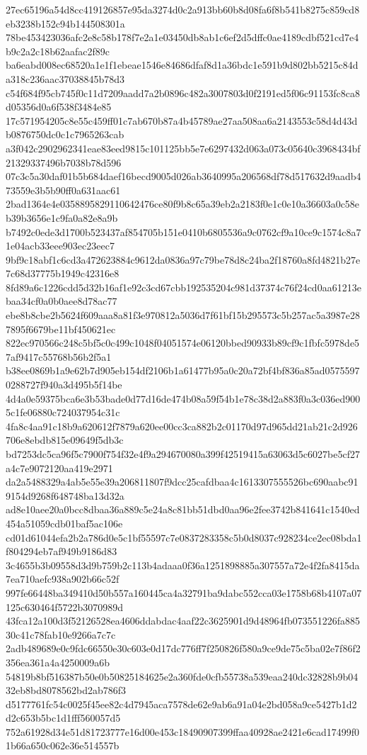 {27ec65196a54d8cc419126857e95da3274d0c2a913bb60b8d08fa6f8b541b8275c859cd8eb3238b152c94b144508301a
78be453423036afc2e8c58b178f7e2a1e03450db8ab1c6ef2d5dffc0ae4189cdbf521cd7e4b9c2a2c18b62aafac2f89c
ba6eabd008ec68520a1e1f1ebeae1546e84686dfaf8d1a36bdc1e591b9d802bb5215c84da318c236aac37038845b78d3
c54f684f95cb745f0c11d7209aadd7a2b0896c482a3007803d0f2191ed5f06c91153fc8ca8d05356d0a6f538f3484e85
17c571954205c8e55c459ff01c7ab670b87a4b45789ae27aa508aa6a2143553c58d4d43db0876750dc0c1c7965263cab
a3f042c2902962341eae83eed9815c101125bb5e7e6297432d063a073c05640c3968434bf21329337496b7038b78d596
07c3c5a30daf01b5b684daef16becd9005d026ab3640995a206568df78d517632d9aadb473559e3b5b90ff0a631aac61
2bad1364e4e0358895829110642476ce80f9b8c65a39eb2a2183f0e1c0e10a36603a0c58eb39b3656e1c9fa0a82e8a9b
b7492c0ede3d1700b523437af854705b151e0410b6805536a9c0762cf9a10ce9c1574c8a71e04acb33eee903ec23eec7
9bf9c18abf1c6cd3a472623884c9612da0836a97c79be78d8c24ba2f18760a8fd4821b27e7c68d37775b1949c42316e8
8fd89a6c1226cdd5d32b16af1e92c3cd67cbb192535204c981d37374c76f24cd0aa61213ebaa34cf0a0b0aee8d78ac77
ebe8b8cbe2b5624f609aaa8a81f3e970812a5036d7f61bf15b295573c5b257ac5a3987e287895f6679be11bf450621ec
822ec970566c248c5bf5c0c499c1048f04051574e06120bbed90933b89cf9c1fbfc5978de57af9417c55768b56b2f5a1
b38ee0869b1a9e62b7d905eb154df2106b1a61477b95a0c20a72bf4bf836a85ad05755970288727f940a3d495b5f14be
4d4a0e59375bca6e3b53bade0d77d16de474b08a59f54b1e78c38d2a883f0a3c036ed9005c1fe06880c724037954c31c
4fa8c4aa91c18b9a620612f7879a620ee00cc3ca882b2c01170d97d965dd21ab21c2d926706e8ebdb815e09649f5db3c
bd7253dc5ca96f5c7900f754f32e4f9a294670080a399f42519415a63063d5c6027be5cf27a4c7e9072120aa419e2971
da2a5488329a4ab5e55e39a206811807f9dcc25cafdbaa4c1613307555526bc690aabc919154d9268f648748ba13d32a
ad8e10aee20a0bcc8dbaa36a889c5e24a8c81bb51dbd0aa96e2fee3742b841641c1540ed454a51059cdb01baf5ac106e
cd01d61044efa2b2a786d0e5c1bf55597c7e0837283358c5b0d8037c928234ce2ec08bda1f804294eb7af949b9186d83
3c4655b3b09558d3d9b759b2c113b4adaaa0f36a1251898885a307557a72e4f2fa8415da7ea710aefc938a902b66c52f
997fe66448ba349410d50b557a160445ca4a32791ba9dabc552cca03e1758b68b4107a07125c630464f5722b3070989d
43fca12a100d3f52126528ea4606ddabdac4aaf22c3625901d9d48964fb073551226fa88530c41c78fab10e9266a7c7c
2adb489689e0c9fdc66550e30c603e0d17dc776ff7f250826f580a9ce9de75c5ba02e7f86f2356ea361a4a4250009a6b
54819b8bf516387b50e0b50825184625e2a360fde0cfb55738a539eaa240dc32828b9b0432eb8bd8078562bd2ab786f3
d5177761fc54c0025f45ee82c4d7945aca7578de62e9ab6a91a04e2bd058a9ce5427b1d2d2c653b5bc1d1fff560057d5
752a61928d34e51d81723777e16d00e453c18490907399ffaa40928ae2421e6cad17499f01b66a650c062e36e514557b
}

